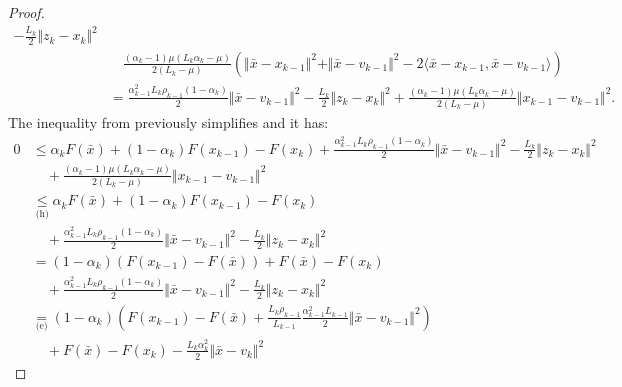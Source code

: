 \documentclass[12pt]{article}
\begin{document}
\begin{proof}
{\begin{align*}
                - \frac{L_k}{2}\Vert z_k - x_k\Vert^2 
                \\ & \quad
                    \frac{(\alpha_k - 1)\mu(L_k\alpha_k - \mu)}{2(L_k - \mu)}\left(
                        \Vert \bar x - x_{k - 1}\Vert^2 + \Vert \bar x - v_{k - 1}\Vert^2 - 2\langle\bar x - x_{k - 1},\bar x - v_{k - 1} \rangle
                    \right)
                \\
                &= \frac{\alpha_{k - 1}^2L_k \rho_{k - 1}(1 - \alpha_k)}{2}\Vert \bar x - v_{k - 1}\Vert^2
                - \frac{L_k}{2}\Vert z_k - x_k\Vert^2 
                + \frac{(\alpha_k - 1)\mu(L_k\alpha_k - \mu)}{2(L_k - \mu)}\Vert x_{k - 1} - v_{k - 1}\Vert^2. 
            \end{align*}
            }
            The inequality from previously simplifies and it has: 
            {\allowdisplaybreaks\small
            \begin{align*}
                0 &\le 
                \alpha_k F(\bar x) + (1 - \alpha_k)F(x_{k - 1}) - F(x_k)
                + \frac{\alpha_{k - 1}^2L_k \rho_{k - 1}(1 - \alpha_k)}{2}\Vert \bar x - v_{k - 1}\Vert^2
                - \frac{L_k}{2}\Vert z_k - x_k\Vert^2 \\ &\quad 
                    + \frac{(\alpha_k - 1)\mu(L_k\alpha_k - \mu)}{2(L_k - \mu)}\Vert x_{k - 1} - v_{k - 1}\Vert^2
                \\
                &\underset{\text{(h)}}{\le}
                \alpha_k F(\bar x) + (1 - \alpha_k)F(x_{k - 1}) - F(x_k)
                    \\ &\quad
                    + \frac{\alpha_{k - 1}^2L_k \rho_{k - 1}(1 - \alpha_k)}{2}\Vert \bar x - v_{k - 1}\Vert^2
                    - \frac{L_k}{2}\Vert z_k - x_k\Vert^2 
                \\
                &= (1 - \alpha_k)(F(x_{k - 1}) - F(\bar x)) + F(\bar x) - F(x_k) \\&\quad
                    + \frac{\alpha_{k - 1}^2L_k \rho_{k - 1}(1 - \alpha_k)}{2}\Vert \bar x - v_{k - 1}\Vert^2
                    - \frac{L_k}{2}\Vert z_k - x_k\Vert^2 
                \\
                &\underset{\text{(e)}}{=} 
                (1 - \alpha_k)\left(
                    F(x_{k - 1}) - F(\bar x) 
                    + \frac{L_k\rho_{k - 1}}{L_{k - 1}}\frac{\alpha_{k - 1}^2L_{k - 1}}{2}\Vert \bar x - v_{k - 1}\Vert^2
                \right) \\ &\quad
                    + F(\bar x) - F(x_k)-  \frac{L_k\alpha_k^2}{2}\Vert \bar x - v_k\Vert^2 

\end{align*}}
\end{proof}
\end{document}
